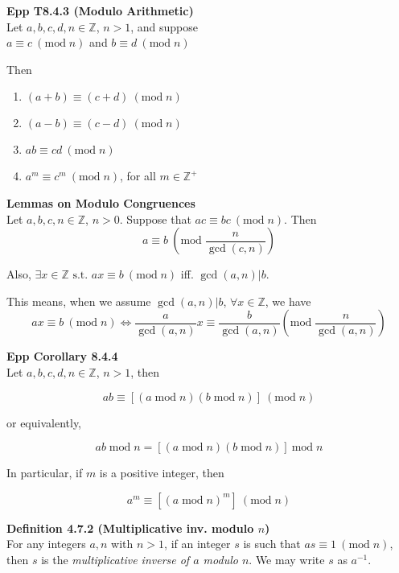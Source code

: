 \documentclass[a4paper]{article}
\newcommand{\subheading}[1]{{\scriptsize\textbf{#1}}}
\begin{document}
\begin{multicols*}{4}
\subheading{Epp T8.4.3 (Modulo Arithmetic)}\\
Let $a, b, c, d, n \in \mathbb{Z}$, $n > 1$, and suppose\\

{\centering
	$a \equiv c\ (\mathrm{mod}\; n)$ and $b \equiv d\ (\textrm{mod}\; n)$\\
}

Then

\begin{enumerate} \itemsep -0.5em
	\item $(a + b) \equiv (c + d)\ (\mathrm{mod}\;n)$
	\item $(a - b) \equiv (c - d)\ (\mathrm{mod}\;n)$
	\item $ab \equiv cd\ (\mathrm{mod}\;n)$
	\item $a^m \equiv c^m\ (\mathrm{mod}\;n)$, for all $m \in \mathbb{Z}^+$
\end{enumerate}

\subheading{Lemmas on Modulo Congruences}\\
Let $a, b, c, n \in \mathbb{Z}$, $n > 0$. Suppose that $ac \equiv bc\ (\mathrm{mod}\;n)$. Then
$$ a \equiv b\ (\mathrm{mod}\;\frac{n}{\gcd(c,n)})$$

Also, $\exists x \in \mathbb{Z} \text{ s.t. } ax \equiv b\ (\mathrm{mod}\;n)$ iff. $\gcd(a,n)|b$.

This means, when we assume $\gcd(a,n)|b$, $\forall x \in \mathbb{Z}$, we have
$$ax \equiv b\ (\mathrm{mod}\;n) \Leftrightarrow \frac{a}{\gcd(a,n)}x \equiv \frac{b}{\gcd(a,n)} (\mathrm{mod}\;\frac{n}{\gcd(a,n)})$$

\subheading{Epp Corollary 8.4.4}\\
Let $a, b, c, d, n \in \mathbb{Z}$, $n > 1$, then

$$ ab \equiv [(a\;\mathrm{mod}\;n)(b\;\mathrm{mod}\;n)]\ (\mathrm{mod}\;n) $$

or equivalently,

$$ ab\;\mathrm{mod}\;n = [(a\;\mathrm{mod}\;n)(b\;\mathrm{mod}\;n)]\ \mathrm{mod}\;n $$

In particular, if $m$ is a positive integer, then

$$ a^m \equiv [(a\;\textrm{mod}\;n)^m]\ (\mathrm{mod}\;n) $$

\subheading{Definition 4.7.2 (Multiplicative inv. modulo $n$)}\\
For any integers $a, n$ with $n > 1$, if an integer $s$ is such that $as \equiv
1\ (\mathrm{mod}\;n)$, then $s$ is the \textit{multiplicative inverse of $a$
	modulo $n$}. We may write $s$ as $a^{-1}$.\\


\end{multicols*}
\end{document}
